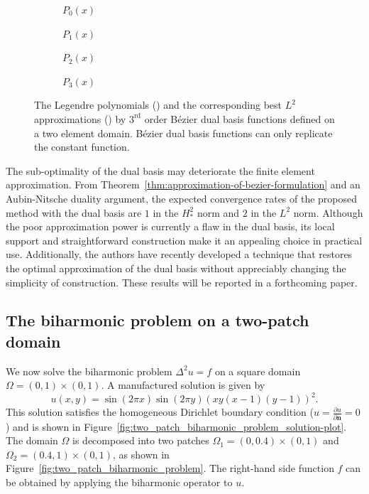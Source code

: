 \begin{figure}[ht]
	\captionsetup[subfigure]{labelformat=empty, font = footnotesize}
	\centering
	\begin{subfigure}[b]{0.47\textwidth}
		\centering
		
		\caption{$P_0(x)$}
	\end{subfigure}
	\begin{subfigure}[b]{0.47\textwidth}
		\centering
		
		\caption{$P_1(x)$}
	\end{subfigure}
	\begin{subfigure}[b]{0.47\textwidth}
		\centering
		
		\caption{$P_2(x)$}
	\end{subfigure}
	\begin{subfigure}[b]{0.47\textwidth}
		\centering
		
		\caption{$P_3(x)$}
	\end{subfigure}
	\caption{The Legendre polynomials (\protect\blueline) and the corresponding best $L^2$ approximations (\protect\redline) by $3^\text{rd}$ order B\'ezier dual basis functions defined on a two element domain. B\'ezier dual basis functions can only replicate the constant function.}
	\label{fig:polynomial_completeness}
\end{figure}
The sub-optimality of the \Bezier dual basis may deteriorate the finite element approximation. From Theorem~\ref{thm:approximation-of-bezier-formulation} and an Aubin-Nitsche duality argument, the expected convergence rates of the proposed method with the \Bezier dual basis are $1$ in the $H^2_*$ norm and $2$ in the $L^2$ norm. Although the poor approximation power is currently a flaw in the \Bezier dual basis, its local support and straightforward construction make it an appealing choice in practical use. Additionally, the authors have recently developed a technique that restores the optimal approximation of the \Bezier dual basis without appreciably changing the simplicity of construction. These results will be reported in a forthcoming paper.
\FloatBarrier

\subsection{The biharmonic problem on a two-patch domain}\label{sec:two_patch}

We now solve the biharmonic problem $\Delta^2{}u=f$ on a square domain $\Omega={(0,1)\times(0,1)}$. A manufactured solution is given by
\begin{equation}
	u(x,y)=\sin(2\pi{x})\sin(2\pi{y})(xy(x-1)(y-1))^2.
\end{equation}
This solution satisfies the homogeneous Dirichlet boundary condition ($u=\frac{\partial{u}}{\partial{\mathbf{n}}}=0$) and is shown in Figure~\ref{fig:two_patch_biharmonic_problem_solution-plot}. The domain $\Omega$ is decomposed into two patches $\Omega_1={(0,0.4)\times(0,1)}$ and $\Omega_2={(0.4,1)\times(0,1)}$, as shown in Figure~\ref{fig:two_patch_biharmonic_problem}. The right-hand side function $f$ can be obtained by applying the biharmonic operator to $u$.\par

